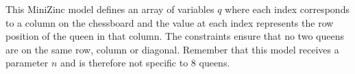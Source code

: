 This MiniZinc model defines an array of variables $q$ where each index corresponds to a column on the chessboard and the value at each index represents the row position of the queen in that column. The constraints ensure that no two queens are on the same row, column or diagonal. Remember that this model receives a parameter $n$ and is therefore not specific to $8$ queens.

